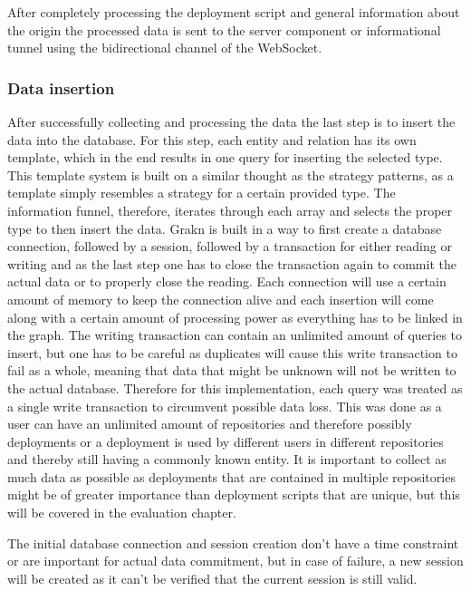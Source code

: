 After completely processing the deployment script and general information about the origin the processed data is sent to the server component or informational tunnel using the bidirectional channel of the WebSocket.

\subsubsection{Data insertion}
After successfully collecting and processing the data the last step is to insert the data into the database. For this step, each entity and relation has its own template, which in the end results in one query for inserting the selected type. This template system is built on a similar thought as the strategy patterns, as a template simply resembles a strategy for a certain provided type. The information funnel, therefore, iterates through each array and selects the proper type to then insert the data.
Grakn is built in a way to first create a database connection, followed by a session, followed by a transaction for either reading or writing and as the last step one has to close the transaction again to commit the actual data or to properly close the reading.
Each connection will use a certain amount of memory to keep the connection alive and each insertion will come along with a certain amount of processing power as everything has to be linked in the graph.
The writing transaction can contain an unlimited amount of queries to insert, but one has to be careful as duplicates will cause this write transaction to fail as a whole, meaning that data that might be unknown will not be written to the actual database. Therefore for this implementation, each query was treated as a single write transaction to circumvent possible data loss. This was done as a user can have an unlimited amount of repositories and therefore possibly deployments or a deployment is used by different users in different repositories and thereby still having a commonly known entity. It is important to collect as much data as possible as deployments that are contained in multiple repositories might be of greater importance than deployment scripts that are unique, but this will be covered in the evaluation chapter.

The initial database connection and session creation don't have a time constraint or are important for actual data commitment, but in case of failure, a new session will be created as it can't be verified that the current session is still valid.

